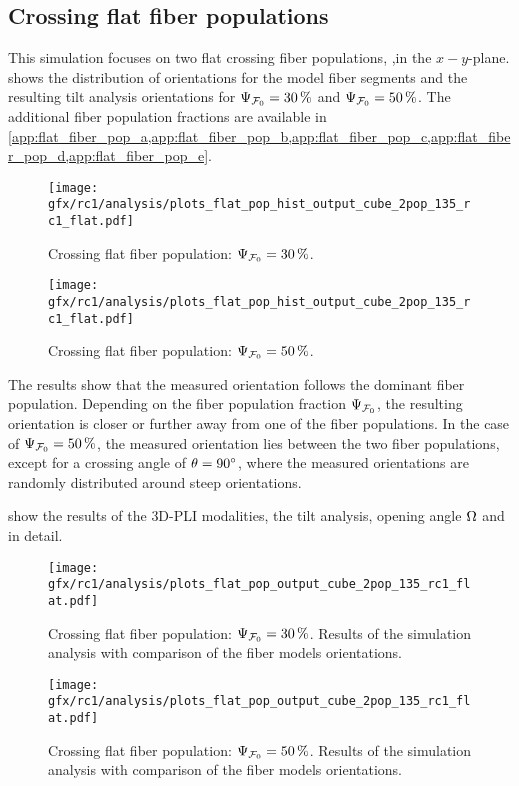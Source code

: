 \subsection{Crossing flat fiber populations}
\label{sec:resCrossFlat}
%
This simulation focuses on two flat crossing fiber populations, \ie{},in the $x-y$-plane.
 shows the distribution of orientations for the model fiber segments and the resulting tilt analysis orientations for $\textnormal{$\Psi_{\textnormal{$\mathcal{F}_0$}}$} = \SI{30}{\percent}$ and $\textnormal{$\Psi_{\textnormal{$\mathcal{F}_0$}}$} = \SI{50}{\percent}$.
The additional fiber population fractions are available in \cref{app:flat_fiber_pop_a,app:flat_fiber_pop_b,app:flat_fiber_pop_c,app:flat_fiber_pop_d,app:flat_fiber_pop_e}.
\par
% 
\begin{figure}[!p]
\centering
\texttt{[image: gfx/rc1/analysis/plots\_flat\_pop\_hist\_output\_cube\_2pop\_135\_rc1\_flat.pdf]}
\caption{Crossing flat fiber population: $\textnormal{$\Psi_{\textnormal{$\mathcal{F}_0$}}$}=\SI{30}{\percent}$.}
\label{fig:flat_03_fiber_pop_hist}
% 
\vspace{2em}
\texttt{[image: gfx/rc1/analysis/plots\_flat\_pop\_hist\_output\_cube\_2pop\_135\_rc1\_flat.pdf]}
\caption{Crossing flat fiber population: $\textnormal{$\Psi_{\textnormal{$\mathcal{F}_0$}}$}=\SI{50}{\percent}$.}
\label{fig:flat_05_fiber_pop_hist}
\end{figure}
%
The results show that the measured orientation follows the dominant fiber population.
Depending on the fiber population fraction $\textnormal{$\Psi_{\textnormal{$\mathcal{F}_0$}}$}$, the resulting orientation is closer or further away from one of the fiber populations.
In the case of $\textnormal{$\Psi_{\textnormal{$\mathcal{F}_0$}}$} = \SI{50}{\percent}$, the measured orientation lies between the two fiber populations, except for a crossing angle of $\textnormal{$\theta$}=\SI{90}{\degree}$, where the measured orientations are randomly distributed around steep orientations.
\par
% 
 show the results of the \ac{3D-PLI} modalities, the tilt analysis, opening angle $\textnormal{$\Omega$}$ and \accvalue{} in detail.
\par
% 
\begin{figure}[!p]
\centering
\texttt{[image: gfx/rc1/analysis/plots\_flat\_pop\_output\_cube\_2pop\_135\_rc1\_flat.pdf]}
\caption{Crossing flat fiber population: $\textnormal{$\Psi_{\textnormal{$\mathcal{F}_0$}}$}=\SI{30}{\percent}$. Results of the simulation analysis with comparison of the fiber models orientations.}
\label{fig:flat_03_fiber_pop_rofl}
\end{figure}
%
\begin{figure}[!p]
\centering
\texttt{[image: gfx/rc1/analysis/plots\_flat\_pop\_output\_cube\_2pop\_135\_rc1\_flat.pdf]}
\caption{Crossing flat fiber population: $\textnormal{$\Psi_{\textnormal{$\mathcal{F}_0$}}$}=\SI{50}{\percent}$. Results of the simulation analysis with comparison of the fiber models orientations.}
\label{fig:flat_05_fiber_pop_rofl}
\end{figure}
